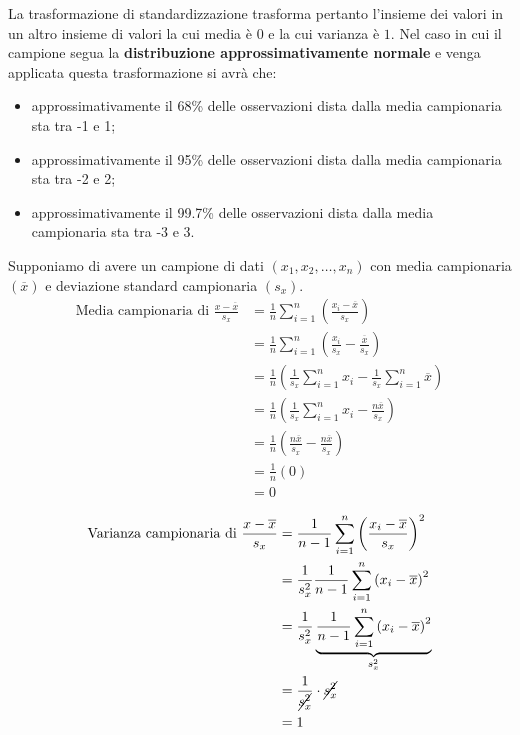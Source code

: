 \noindent La trasformazione di standardizzazione trasforma pertanto l’insieme dei valori in un altro insieme
di valori la cui media è $0$ e la cui varianza è $1$.
Nel caso in cui il campione segua la \textbf{distribuzione approssimativamente normale} e venga applicata questa trasformazione si avrà che:
\begin{itemize}
    \item approssimativamente il 68\% delle osservazioni dista dalla media campionaria sta tra -1 e 1;
    \item approssimativamente il 95\% delle osservazioni dista dalla media campionaria sta tra -2 e 2;
    \item approssimativamente il 99.7\% delle osservazioni dista dalla media campionaria sta tra -3 e 3.
\end{itemize}

\begin{dimostrazione}
Supponiamo di avere un campione di dati $(x_1, x_2, \ldots, x_n)$ con media campionaria $(\overline{x})$ e deviazione standard campionaria $(s_x)$.
\begin{align*}
\text{Media campionaria di }\frac{x - \overline{x}}{s_x} & = \frac{1}{n} \sum_{i=1}^{n} \left(\frac{x_i - \overline{x}}{s_x}\right) \\
& = \frac{1}{n} \sum_{i=1}^{n} \left(\frac{x_i}{s_x} - \frac{\overline{x}}{s_x}\right) \\
& = \frac{1}{n} \left(\frac{1}{s_x} \sum_{i=1}^{n} x_i - \frac{1}{s_x} \sum_{i=1}^{n} \overline{x}\right) \\
& = \frac{1}{n} \left(\frac{1}{s_x} \sum_{i=1}^{n} x_i - \frac{n\overline{x}}{s_x} \right) \\
& = \frac{1}{n} \left(\frac{n\overline{x}}{s_x} - \frac{n\overline{x}}{s_x}\right) \\
& = \frac{1}{n} \left(0\right) \\
& = 0
\end{align*}
\end{dimostrazione}

\begin{dimostrazione}
\begin{align*}
\text{Varianza campionaria di }\frac{x - \overline{x}}{s_x} & = \frac{1}{n-1} \sum_{i=1}^{n} \left(\frac{x_i - \overline{x}}{s_x}\right)^2 \\
& = \frac{1}{s_x^2} \frac{1}{n-1} \sum_{i=1}^{n} \left(x_i - \overline{x}\right)^2  \\
& = \frac{1}{s_x^2} \underbrace{\frac{1}{n-1} \sum_{i=1}^{n} \left(x_i - \overline{x}\right)^2}_{s_x^2} \\
& = \frac{1}{\cancel{s_x^2}} \cdot \cancel{s_x^2} \\
& = 1
\end{align*}
\end{dimostrazione}

